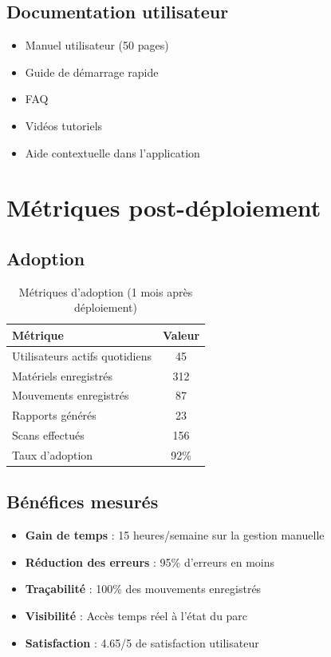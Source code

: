 \subsection{Documentation utilisateur}

\begin{itemize}
    \item Manuel utilisateur (50 pages)
    \item Guide de démarrage rapide
    \item FAQ
    \item Vidéos tutoriels
    \item Aide contextuelle dans l'application
\end{itemize}

\section{Métriques post-déploiement}

\subsection{Adoption}

\begin{table}[H]
\centering
\caption{Métriques d'adoption (1 mois après déploiement)}
\begin{tabularx}{\textwidth}{|l|c|}
\hline
\textbf{Métrique} & \textbf{Valeur} \\
\hline
Utilisateurs actifs quotidiens & 45 \\
\hline
Matériels enregistrés & 312 \\
\hline
Mouvements enregistrés & 87 \\
\hline
Rapports générés & 23 \\
\hline
Scans effectués & 156 \\
\hline
Taux d'adoption & 92\% \\
\hline
\end{tabularx}
\end{table}

\subsection{Bénéfices mesurés}

\begin{itemize}
    \item \textbf{Gain de temps} : 15 heures/semaine sur la gestion manuelle
    \item \textbf{Réduction des erreurs} : 95\% d'erreurs en moins
    \item \textbf{Traçabilité} : 100\% des mouvements enregistrés
    \item \textbf{Visibilité} : Accès temps réel à l'état du parc
    \item \textbf{Satisfaction} : 4.65/5 de satisfaction utilisateur
\end{itemize}


